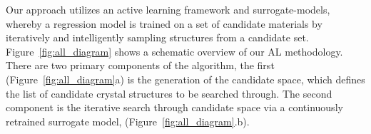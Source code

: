%
%
%
%
%



%
%
%
Our approach utilizes an active learning framework and surrogate-models,
whereby a regression model is trained on a set of candidate materials by iteratively and intelligently sampling structures from a candidate set.
%
Figure~\ref{fig:all_diagram} shows a schematic overview of our AL methodology.
%
There are two primary components of the algorithm, the first (Figure~\ref{fig:all_diagram}a) is the generation of the candidate space,
which defines the list of candidate crystal structures to be searched through.
%
The second component is the iterative search through candidate space via a continuously retrained surrogate model, (Figure~\ref{fig:all_diagram}.b).


